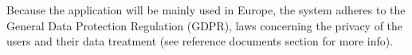 Because the application will be mainly used in Europe, the system adheres to the General Data Protection Regulation (GDPR), laws concerning the privacy of the users and their data treatment (see reference documents section for more info).

